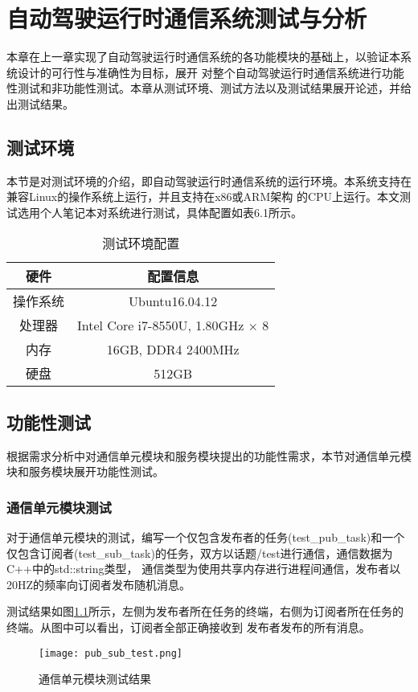 \chapter{自动驾驶运行时通信系统测试与分析}
本章在上一章实现了自动驾驶运行时通信系统的各功能模块的基础上，以验证本系统设计的可行性与准确性为目标，展开
对整个自动驾驶运行时通信系统进行功能性测试和非功能性测试。本章从测试环境、测试方法以及测试结果展开论述，并给出测试结果。

\section{测试环境}
本节是对测试环境的介绍，即自动驾驶运行时通信系统的运行环境。本系统支持在兼容Linux的操作系统上运行，并且支持在x86或ARM架构
的CPU上运行。本文测试选用个人笔记本对系统进行测试，具体配置如表6.1所示。
\begin{table}[htb]
  \centering\small
  \caption{测试环境配置}
  \label{tab:exampletable}
  \begin{tabular}{cc}
    \toprule
    硬件 & 配置信息 \\
    \midrule
    操作系统 & Ubuntu16.04.12\\
    处理器 & Intel Core i7-8550U, 1.80GHz $\times$ 8\\
    内存 & 16GB, DDR4 2400MHz\\
    硬盘 & 512GB\\
    \bottomrule
  \end{tabular}
\end{table}
    
\section{功能性测试}
根据需求分析中对通信单元模块和服务模块提出的功能性需求，本节对通信单元模块和服务模块展开功能性测试。
\subsection{通信单元模块测试}
对于通信单元模块的测试，编写一个仅包含发布者的任务(test\_pub\_task)和一个仅包含订阅者(test\_sub\_task)的任务，双方以话题/test进行通信，通信数据为C++中的std::string类型，
通信类型为使用共享内存进行进程间通信，发布者以20HZ的频率向订阅者发布随机消息。


测试结果如图\ref{pub_sub_test}所示，左侧为发布者所在任务的终端，右侧为订阅者所在任务的终端。从图中可以看出，订阅者全部正确接收到
发布者发布的所有消息。

\begin{figure}[H]
  \centering
  \texttt{[image: pub\_sub\_test.png]}
  \caption{通信单元模块测试结果}
  \label{pub_sub_test}
\end{figure}

